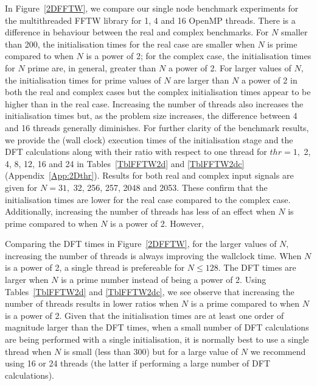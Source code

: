 \documentclass[a4paper]{article}
\begin{document}
In Figure~\ref{2DFFTW}, we compare our single node benchmark
experiments for the multithreaded FFTW library for 1, 4 and 16 OpenMP
threads. There is a difference in behaviour between the real and
complex benchmarks. For $N$ smaller than 200, the initialisation times
for the real case are smaller when $N$ is prime compared to when $N$
is a power of 2; for the complex case, the initialisation times for
$N$ prime are, in general, greater than $N$ a power of 2. For larger
values of $N,$ the initialisation times for prime values of $N$ are
larger than $N$ a power of 2 in both the real and complex cases but
the complex initialisation times appear to be higher than in the real
case. Increasing the number of threads also increases the
initialisation times but, as the problem size increases, the
difference between 4 and 16 threads generally diminishes. For further
clarity of the benchmark results, we provide the (wall clock)
execution times of the initialisation stage and the DFT calculations
along with their ratio with respect to one thread for $thr=1,$ 2, 4,
8, 12, 16 and 24 in Tables~\ref{TblFFTW2d} and
\ref{TblFFTW2dc} (Appendix~\ref{App:2Dthr}). Results for both real and complex input signals are
given for $N=31,$ 32, 256, 257, 2048 and 2053. These confirm that the
initialisation times are lower for the real case compared to the
complex case. Additionally, increasing the number of threads has less
of an effect when $N$ is prime compared to when $N$ is a power of
2. However,

Comparing the DFT times in Figure~\ref{2DFFTW}, for the larger values
of $N,$ increasing the number of threads is always improving the
wallclock time. When $N$ is a power of 2, a single thread is
prefereable for $N\le 128.$ The DFT times are larger when $N$ is a
prime number instead of being a power of 2. Using
Tables~\ref{TblFFTW2d} and \ref{TblFFTW2dc}, we see observe that
increasing the number of threads results in lower ratios when $N$ is a
prime compared to when $N$ is a power of 2. Given that the
initialisation times are at least one order of magnitude larger than
the DFT times, when a small number of DFT calculations are being
performed with a single initialisation, it is normally best to use a
single thread when $N$ is small (less than 300) but for a large value
of $N$ we recommend using 16 or 24 threads (the latter if performing a
large number of DFT calculations).
\end{document}
